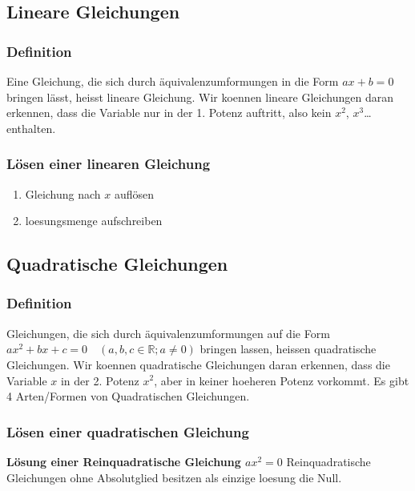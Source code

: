 \begin{multicols}{2}
    \subsection{Lineare Gleichungen}
    \vspace{-4mm}
    \subsubsection{Definition}
    \vspace{-4mm}
    Eine Gleichung, die sich durch äquivalenzumformungen in die Form $ax + b = 0$ bringen lässt, heisst lineare Gleichung. Wir koennen lineare Gleichungen daran erkennen, dass die Variable nur in der 1. Potenz auftritt, also kein $x^2$, $x^3$\dots enthalten.

    \subsubsection{Lösen einer linearen Gleichung}
    \begin{enumerate}
        \item Gleichung nach $x$ auflösen
        \item loesungsmenge aufschreiben
    \end{enumerate}

    \subsection{Quadratische Gleichungen}
    \vspace{-4mm}
    \subsubsection{Definition}
    \vspace{-4mm}
    Gleichungen, die sich durch äquivalenzumformungen auf die Form $ax^2 + bx + c = 0 \quad (a, b, c \in \mathbb{R}; a \neq 0)$
    bringen lassen, heissen quadratische Gleichungen. Wir koennen quadratische Gleichungen daran erkennen, dass die Variable $x$ in der 2. Potenz $x^2$, aber in keiner hoeheren Potenz vorkommt. Es gibt 4 Arten/Formen von Quadratischen Gleichungen.
    \subsubsection{Lösen einer quadratischen Gleichung}
    \vspace{-4mm}
    \textbf{Lösung einer Reinquadratische Gleichung $ax^2 = 0$}
    Reinquadratische Gleichungen ohne Absolutglied besitzen als einzige loesung die Null.


\end{multicols}
